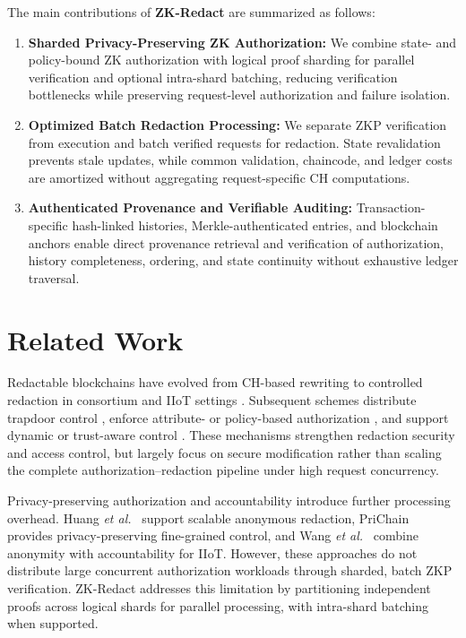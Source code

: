 \documentclass[lettersize,journal]{IEEEtran}
\begin{document}
The main contributions of \textbf{ZK-Redact} are summarized as follows:
\begin{enumerate}

\item \textbf{Sharded Privacy-Preserving ZK Authorization:}
We combine state- and policy-bound ZK authorization with logical proof
sharding for parallel verification and optional intra-shard batching,
reducing verification bottlenecks while preserving request-level
authorization and failure isolation.

\item \textbf{Optimized Batch Redaction Processing:}
We separate ZKP verification from execution and batch verified requests
for redaction. State revalidation prevents stale updates, while common
validation, chaincode, and ledger costs are amortized without aggregating
request-specific CH computations.

\item \textbf{Authenticated Provenance and Verifiable Auditing:}
Transaction-specific hash-linked histories, Merkle-authenticated entries,
and blockchain anchors enable direct provenance retrieval and verification
of authorization, history completeness, ordering, and state continuity
without exhaustive ledger traversal.
\end{enumerate}

\section{Related Work}
\label{sec:related}

Redactable blockchains have evolved from CH-based rewriting
\cite{ref9} to controlled redaction in consortium and IIoT settings
\cite{ref2}. Subsequent schemes distribute trapdoor control
\cite{ref1,ref6,ref19}, enforce attribute- or policy-based
authorization \cite{ref15}, and support dynamic or
trust-aware control \cite{ref16}. These mechanisms strengthen
redaction security and access control, but largely focus on secure
modification rather than scaling the complete authorization--redaction
pipeline under high request concurrency.

Privacy-preserving authorization and accountability introduce further
processing overhead. Huang \emph{et al.}~\cite{ref14} support scalable
anonymous redaction, PriChain~\cite{ref4} provides privacy-preserving
fine-grained control, and Wang \emph{et al.}~\cite{ref17} combine
anonymity with accountability for IIoT. However, these approaches do not
distribute large concurrent authorization workloads through sharded,
batch ZKP verification. ZK-Redact addresses this limitation by
partitioning independent proofs across logical shards for parallel
processing, with intra-shard batching when supported.
\end{document}
